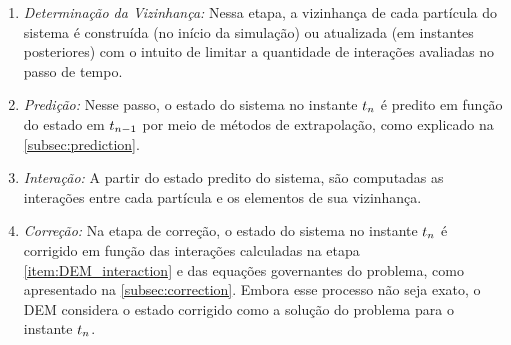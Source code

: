 \begin{enumerate}
	\item \textit{Determinação da Vizinhança:} Nessa etapa, a vizinhança de cada partícula do sistema é construída (no início da simulação) ou atualizada (em instantes posteriores) com o intuito de limitar a quantidade de interações avaliadas no passo de tempo. \label{item:DEM_neighborhood}
	\item \textit{Predição:} Nesse passo, o estado do sistema no instante \(\instant[n]\) é predito em função do estado em \(\instant[n-1]\) por meio de métodos de extrapolação, como explicado na \autoref{subsec:prediction}. \label{item:DEM_prediction}
	\item \textit{Interação:} A partir do estado predito do sistema, são computadas as interações entre cada partícula e os elementos de sua vizinhança. \label{item:DEM_interaction}
	\item \textit{Correção:} Na etapa de correção, o estado do sistema no instante \(\instant[n]\) é corrigido em função das interações calculadas na etapa \ref{item:DEM_interaction} e das equações governantes do problema, como apresentado na \autoref{subsec:correction}. Embora esse processo não seja exato, o DEM considera o estado corrigido como a solução do problema para o instante \(\instant[n]\). \label{item:DEM_correction}
\end{enumerate}


